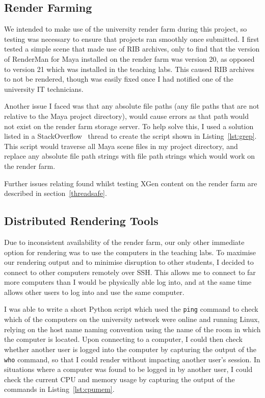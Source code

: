 \documentclass[11pt]{article}
\begin{document}
\subsection{Render Farming}

We intended to make use of the university render farm during this project, so testing was necessary to ensure that projects ran smoothly once submitted. I first tested a simple scene that made use of RIB archives, only to find that the version of RenderMan for Maya installed on the render farm was version 20, as opposed to version 21 which was installed in the teaching labs. This caused RIB archives to not be rendered, though was easily fixed once I had notified one of the university IT technicians.

Another issue I faced was that any absolute file paths (any file paths that are not relative to the Maya project directory), would cause errors as that path would not exist on the render farm storage server. To help solve this, I used a solution listed in a StackOverflow~\cite{stackoverflow} thread to create the script shown in Listing~\ref{lst:grep}. This script would traverse all Maya scene files in my project directory, and replace any absolute file path strings with file path strings which would work on the render farm.

Further issues relating found whilst testing XGen content on the render farm are described in section~\ref{threadsafe}.

\subsection{Distributed Rendering Tools}

Due to inconsistent availability of the render farm, our only other immediate option for rendering was to use the computers in the teaching labs. To maximise our rendering output and to minimise disruption to other students, I decided to connect to other computers remotely over SSH. This allows me to connect to far more computers than I would be physically able log into, and at the same time allows other users to log into and use the same computer.

I was able to write a short Python script which used the \texttt{ping} command to check which of the computers on the university network were online and running Linux, relying on the host name naming convention using the name of the room in which the computer is located. Upon connecting to a computer, I could then check whether another user is logged into the computer by capturing the output of the \texttt{who} command, so that I could render without impacting another user's session. In situations where a computer was found to be logged in by another user, I could check the current CPU and memory usage by capturing the output of the commands in Listing~\ref{lst:cpumem}.
\end{document}
